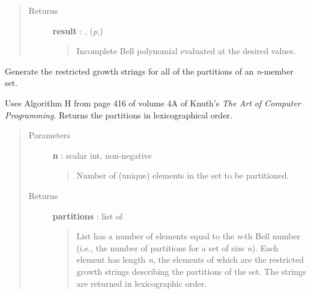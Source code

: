 \documentclass[letterpaper,10pt,english]{sphinxmanual}
\begin{document}
\begin{fulllineitems}
\begin{quote}
\begin{description}
\item[{Returns }] \leavevmode
\textbf{result} : , (\emph{p},)
\begin{quote}

Incomplete Bell polynomial evaluated at the desired values.
\end{quote}

\end{description}\end{quote}

\end{fulllineitems}


\begin{fulllineitems}
\label{gptools:gptools.utils.generate_set_partition_strings}
Generate the restricted growth strings for all of the partitions of an \emph{n}-member set.

Uses Algorithm H from page 416 of volume 4A of Knuth's \emph{The Art of Computer
Programming}. Returns the partitions in lexicographical order.
\begin{quote}\begin{description}
\item[{Parameters }] \leavevmode
\textbf{n} : scalar int, non-negative
\begin{quote}

Number of (unique) elements in the set to be partitioned.
\end{quote}

\item[{Returns }] \leavevmode
\textbf{partitions} : list of 
\begin{quote}

List has a number of elements equal to the \emph{n}-th Bell number (i.e.,
the number of partitions for a set of size \emph{n}). Each element has
length \emph{n}, the elements of which are the restricted growth strings
describing the partitions of the set. The strings are returned in
lexicographic order.
\end{quote}

\end{description}\end{quote}

\end{fulllineitems}

\end{document}
